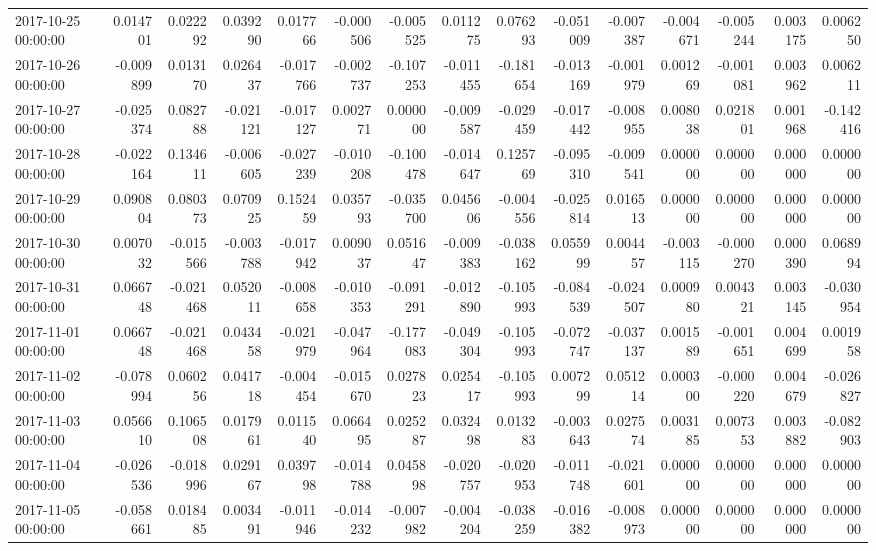 \begin{tabular}{lrrrrrrrrrrrrrr}
2017-10-25 00:00:00 & 0.014701 & 0.022292 & 0.039290 & 0.017766 & -0.000506 & -0.005525 & 0.011275 & 0.076293 & -0.051009 & -0.007387 & -0.004671 & -0.005244 & 0.003175 & 0.006250 \\
2017-10-26 00:00:00 & -0.009899 & 0.013170 & 0.026437 & -0.017766 & -0.002737 & -0.107253 & -0.011455 & -0.181654 & -0.013169 & -0.001979 & 0.001269 & -0.001081 & 0.003962 & 0.006211 \\
2017-10-27 00:00:00 & -0.025374 & 0.082788 & -0.021121 & -0.017127 & 0.002771 & 0.000000 & -0.009587 & -0.029459 & -0.017442 & -0.008955 & 0.008038 & 0.021801 & 0.001968 & -0.142416 \\
2017-10-28 00:00:00 & -0.022164 & 0.134611 & -0.006605 & -0.027239 & -0.010208 & -0.100478 & -0.014647 & 0.125769 & -0.095310 & -0.009541 & 0.000000 & 0.000000 & 0.000000 & 0.000000 \\
2017-10-29 00:00:00 & 0.090804 & 0.080373 & 0.070925 & 0.152459 & 0.035793 & -0.035700 & 0.045606 & -0.004556 & -0.025814 & 0.016513 & 0.000000 & 0.000000 & 0.000000 & 0.000000 \\
2017-10-30 00:00:00 & 0.007032 & -0.015566 & -0.003788 & -0.017942 & 0.009037 & 0.051647 & -0.009383 & -0.038162 & 0.055999 & 0.004457 & -0.003115 & -0.000270 & 0.000390 & 0.068994 \\
2017-10-31 00:00:00 & 0.066748 & -0.021468 & 0.052011 & -0.008658 & -0.010353 & -0.091291 & -0.012890 & -0.105993 & -0.084539 & -0.024507 & 0.000980 & 0.004321 & 0.003145 & -0.030954 \\
2017-11-01 00:00:00 & 0.066748 & -0.021468 & 0.043458 & -0.021979 & -0.047964 & -0.177083 & -0.049304 & -0.105993 & -0.072747 & -0.037137 & 0.001589 & -0.001651 & 0.004699 & 0.001958 \\
2017-11-02 00:00:00 & -0.078994 & 0.060256 & 0.041718 & -0.004454 & -0.015670 & 0.027823 & 0.025417 & -0.105993 & 0.007299 & 0.051214 & 0.000300 & -0.000220 & 0.004679 & -0.026827 \\
2017-11-03 00:00:00 & 0.056610 & 0.106508 & 0.017961 & 0.011540 & 0.066495 & 0.025287 & 0.032498 & 0.013283 & -0.003643 & 0.027574 & 0.003185 & 0.007353 & 0.003882 & -0.082903 \\
2017-11-04 00:00:00 & -0.026536 & -0.018996 & 0.029167 & 0.039798 & -0.014788 & 0.045898 & -0.020757 & -0.020953 & -0.011748 & -0.021601 & 0.000000 & 0.000000 & 0.000000 & 0.000000 \\
2017-11-05 00:00:00 & -0.058661 & 0.018485 & 0.003491 & -0.011946 & -0.014232 & -0.007982 & -0.004204 & -0.038259 & -0.016382 & -0.008973 & 0.000000 & 0.000000 & 0.000000 & 0.000000 \\

\end{tabular}
